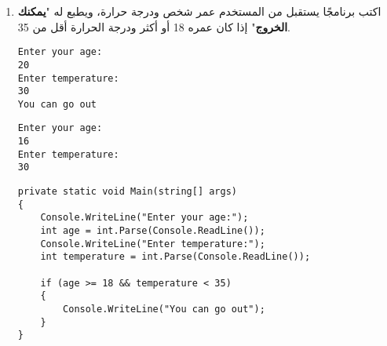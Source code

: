\documentclass[12pt, twoside]{article}
\begin{document}
\begin{enumerate}[itemsep=3em]
\begin{enumerate}

\item
اكتب برنامجًا يستقبل من المستخدم عمر شخص ودرجة حرارة، ويطبع له "\textbf{يمكنك الخروج}" إذا كان عمره 18 أو أكثر ودرجة الحرارة أقل من 35.
\ifdetailed
\begin{boxExample}[1]
\begin{english}
\begin{verbatim}
Enter your age:
20
Enter temperature:
30
You can go out
\end{verbatim}
\end{english}
\end{boxExample}
\begin{boxExample}[2]
\begin{english}
\begin{verbatim}
Enter your age:
16
Enter temperature:
30
\end{verbatim}
\end{english}
\end{boxExample}

\ifwithsols
\begin{boxSolution}
\begin{english}
\begin{verbatim}
private static void Main(string[] args)
{
    Console.WriteLine("Enter your age:");
    int age = int.Parse(Console.ReadLine());
    Console.WriteLine("Enter temperature:");
    int temperature = int.Parse(Console.ReadLine());

    if (age >= 18 && temperature < 35)
    {
        Console.WriteLine("You can go out");
    }
}
\end{verbatim}
\end{english}
\end{boxSolution}
\clearpage
\fi
\fi


\end{enumerate}
\end{enumerate}
\end{document}
